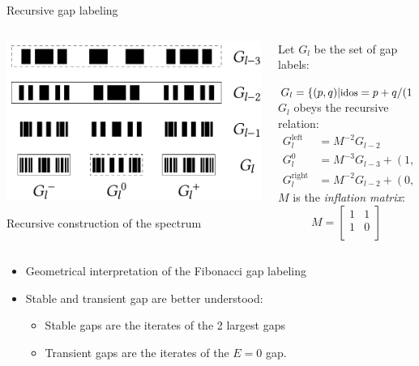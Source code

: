 \documentclass[xcolor=x11names,compress,professionalfonts]{beamer}
\renewcommand{\(}{\begin{columns}}
\renewcommand{\)}{\end{columns}}
\newcommand{\<}[1]{\begin{column}{#1}}
\renewcommand{\>}{\end{column}}
\newcommand{\id}{\ensuremath{\text{idos}}}
\newcommand{\sub}{\ensuremath{M}}
\begin{document}
\begin{frame}{Recursive gap labeling}

\begin{columns}
\newcommand{\s}{.2}

  \begin{column}{5cm}
  \centering
     \includegraphics[scale=.4]{img/recursive_construction_spectrum.pdf}
     
	\small{Recursive construction of the spectrum}
  \end{column}


  \begin{column}{5cm}
Let $G_l$ be the set of gap labels:

$\small{G_l = \{(p,q)| \id = p+q/(1+\alpha)\}}$
$G_l$ obeys the recursive relation:
		\begin{align*}
			G_{l}^{\text{left}} &= \sub^{-2} G_{l-2} \\
			G_{l}^0 &= \sub^{-3} G_{l-3} + (1, -1) \\
			G_{l}^\text{right} &= \sub^{-2} G_{l-2} + (0,1)
		\end{align*}
$M$ is the \emph{inflation matrix}:
\[
			\sub = \begin{bmatrix}
				1 & 1\\
				1 & 0\\
			\end{bmatrix}
			\]
  \end{column}
\end{columns}

\begin{itemize}
	\item Geometrical interpretation of the Fibonacci gap labeling
	\item Stable and transient gap are better understood:
	\begin{itemize}
		\item {\color{BostonBlue}Stable gaps} are the iterates of the 2 largest gaps
		\item {\color{Complementary}Transient gaps} are the iterates of the $E=0$ gap.
	\end{itemize}	 
\end{itemize}

\end{frame}
\end{document}
